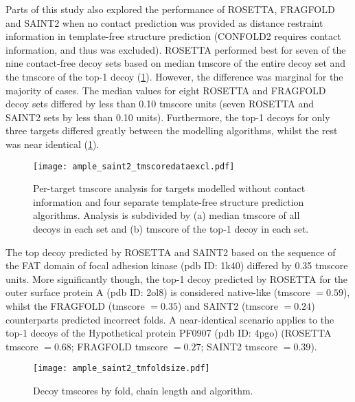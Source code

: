 Parts of this study also explored the performance of ROSETTA, FRAGFOLD and SAINT2 when no contact prediction was provided as distance restraint information in template-free structure prediction (CONFOLD2 requires contact information, and thus was excluded). ROSETTA performed best for seven of the nine contact-free decoy sets based on median \gls{tmscore} of the entire decoy set and the \gls{tmscore} of the top-1 decoy (\cref{fig:ample_saint2_tmscoredataexcl}). However, the difference was marginal for the majority of cases. The median values for eight ROSETTA and FRAGFOLD decoy sets differed by less than 0.10 \gls{tmscore} units (seven ROSETTA and SAINT2 sets by less than 0.10 units). Furthermore, the top-1 decoys for only three targets differed greatly between the modelling algorithms, whilst the rest was near identical (\cref{fig:ample_saint2_tmscoredataexcl}).

\begin{figure}[H]
    \centering
    \texttt{[image: ample\_saint2\_tmscoredataexcl.pdf]}
    \caption[TM-score analysis for four modelling algorithms]{Per-target \gls{tmscore} analysis for targets modelled without contact information and four separate template-free structure prediction algorithms. Analysis is subdivided by (a) median \gls{tmscore} of all decoys in each set and (b) \gls{tmscore} of the top-1 decoy in each set.}
    \label{fig:ample_saint2_tmscoredataexcl}
\end{figure}

The top decoy predicted by ROSETTA and SAINT2 based on the sequence of the FAT domain of focal adhesion kinase (\gls{pdb} ID: 1k40) differed by 0.35 \gls{tmscore} units. More significantly though, the top-1 decoy predicted by ROSETTA for the outer surface protein A (\gls{pdb} ID: 2ol8) is considered native-like (\gls{tmscore} $=0.59$), whilst the FRAGFOLD (\gls{tmscore} $=0.35$) and SAINT2 (\gls{tmscore} $=0.24$) counterparts predicted incorrect folds. A near-identical scenario applies to the top-1 decoys of the Hypothetical protein PF0907 (\gls{pdb} ID: 4pgo) (ROSETTA \gls{tmscore} $=0.68$; FRAGFOLD \gls{tmscore} $=0.27$; SAINT2 \gls{tmscore} $=0.39$).

\begin{figure}[H]
    \centering
    \texttt{[image: ample\_saint2\_tmfoldsize.pdf]}
    \caption[Decoy TM-scores by fold, chain length and algorithm]{Decoy \gls{tmscore}s by fold, chain length and algorithm.}
    \label{fig:ample_saint2_tmfoldsize}
\end{figure}

